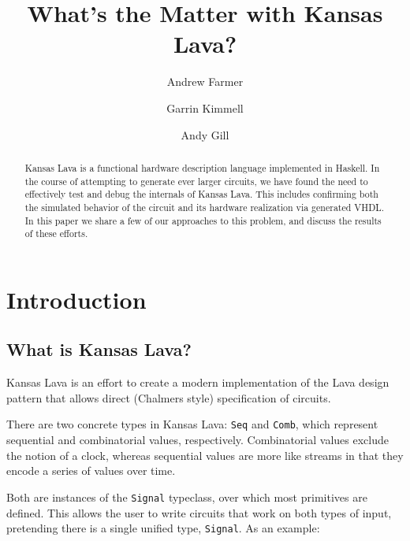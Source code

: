 \documentclass{llncs}
\begin{document}
\title{What's the Matter with Kansas Lava?}

\author{Andrew Farmer \and Garrin Kimmell \and Andy Gill}


\maketitle

\begin{abstract}
Kansas Lava is a functional hardware description language implemented
in Haskell. In the course of attempting to generate ever larger circuits,
we have found the need to effectively test and debug the internals of
Kansas Lava. This includes confirming both the simulated behavior of the
circuit and its hardware realization via generated VHDL. In
this paper we share a few of our approaches to this problem, and discuss
the results of these efforts.
\end{abstract}

\section{Introduction}

\subsection{What is Kansas Lava?}

Kansas Lava is an effort to create a modern implementation of the Lava
design pattern that allows direct (Chalmers style) specification of circuits.

There are two concrete types in Kansas Lava: \verb!Seq! and \verb!Comb!, which represent
sequential and combinatorial values, respectively. Combinatorial values exclude the
notion of a clock, whereas sequential values are more like streams in that they
encode a series of values over time.

Both are instances of the \verb!Signal! typeclass, over which most primitives are defined.
This allows the user to write circuits that work on both types of input, pretending
there is a single unified type, \verb!Signal!. As an example:
\end{document}
